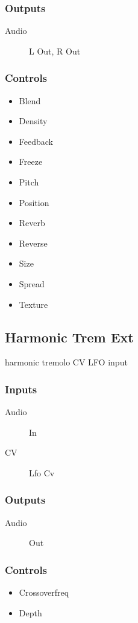 \subsubsection{Outputs}
\begin{description}
\item [Audio] L Out, R Out
\end{description}

\subsubsection{Controls}
\begin{itemize}
\item Blend
\item Density
\item Feedback
\item Freeze
\item Pitch
\item Position
\item Reverb
\item Reverse
\item Size
\item Spread
\item Texture
\end{itemize}

\subsection{Harmonic Trem Ext}

harmonic tremolo CV LFO input



\subsubsection{Inputs}
\begin{description}
\item [Audio] In
\item [CV] Lfo Cv
\end{description}

\subsubsection{Outputs}
\begin{description}
\item [Audio] Out
\end{description}

\subsubsection{Controls}
\begin{itemize}
\item Crossoverfreq
\item Depth
\end{itemize}


